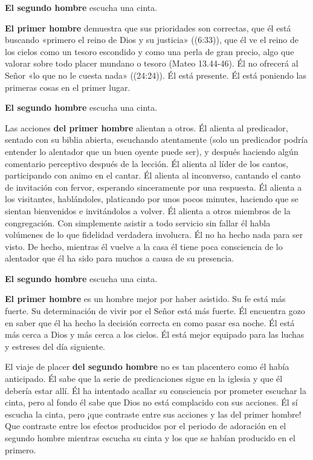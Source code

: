 \documentclass[12pt, twoside, openright]{book}
\begin{document}
\textbf{El segundo hombre} escucha una cinta. 

\textbf{El primer hombre} demuestra que sus prioridades son correctas, que él está buscando «primero el reino de Dios y su justicia» ((6:33)), que él ve el reino de los cielos como un tesoro escondido y como una perla de gran precio, algo que valorar sobre todo placer mundano o tesoro (Mateo 13.44-46). Él no ofrecerá al Señor «lo que no le cuesta nada» ((24:24)). Él está presente. Él está poniendo las primeras cosas en el primer lugar. 

\textbf{El segundo hombre} escucha una cinta. 

Las acciones \textbf{del primer hombre} alientan a otros. Él alienta al predicador, sentado con su biblia abierta, escuchando atentamente (solo un predicador podría entender lo alentador que un buen oyente puede ser), y después haciendo algún comentario perceptivo después de la lección. Él alienta al líder de los cantos, participando con animo en el cantar. Él alienta al inconverso, cantando el canto de invitación con fervor, esperando sinceramente por una respuesta. Él alienta a los visitantes, hablándoles, platicando por unos pocos minutes, haciendo que se sientan bienvenidos e invitándolos a volver. Él alienta a otros miembros de la congregación. Con simplemente asistir a todo servicio sin fallar él habla volúmenes de lo que fidelidad verdadera involucra. Él no ha hecho nada para ser visto. De hecho, mientras él vuelve a la casa él tiene poca consciencia de lo alentador que él ha sido para muchos a causa de su presencia. 

\textbf{El segundo hombre} escucha una cinta. 

\textbf{El primer hombre} es un hombre mejor por haber asistido. Su fe está más fuerte. Su determinación de vivir por el Señor está más fuerte. Él encuentra gozo en saber que él ha hecho la decisión correcta en como pasar esa noche. Él está más cerca a Dios y más cerca a los cielos. Él está mejor equipado para las luchas y estreses del día siguiente. 

El viaje de placer \textbf{del segundo hombre} no es tan placentero como él había anticipado. Él sabe que la serie de predicaciones sigue en la iglesia y que él debería estar allí. Él ha intentado acallar su consciencia por prometer escuchar la cinta, pero al fondo él sabe que Dios no está complacido con sus acciones. Él sí escucha la cinta, pero ¡que contraste entre sus acciones y las del primer hombre! Que contraste entre los efectos producidos por el periodo de adoración en el segundo hombre mientras escucha su cinta y los que se habían producido en el primero. 
\end{document}
